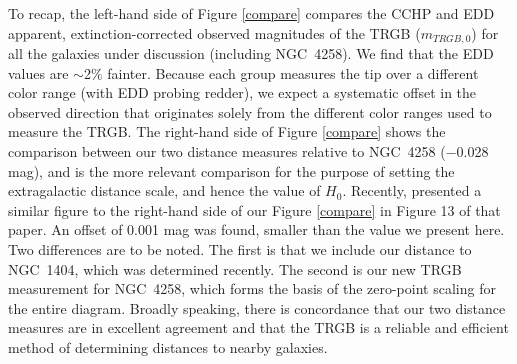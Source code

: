 \documentclass[twocolumn]{aastex62}
\begin{document}
To recap, the left-hand side of Figure \ref{compare} compares the CCHP and EDD apparent, extinction-corrected observed magnitudes of the TRGB ($m_{TRGB,0}$) for all the galaxies under discussion (including NGC~4258). We find that the EDD values are $\sim$2$\%$ fainter. Because each group measures the tip over a different color range (with EDD probing redder), we expect a systematic offset in the observed direction that originates solely from the different color ranges used to measure the TRGB. The right-hand side of Figure \ref{compare} shows the comparison between our two distance measures relative to NGC~4258 ($-$0.028 mag), and is the more relevant comparison for the purpose of setting the extragalactic distance scale, and hence the value of $H_{0}$. Recently, \cite{2021arXiv210613337H} presented a similar figure to the right-hand side of our Figure \ref{compare} in Figure 13 of that paper. An offset of 0.001 mag was found, smaller than the value we present here. Two differences are to be noted. The first is that we include our distance to NGC~1404, which was determined recently. The second is our new TRGB measurement for NGC~4258, which forms the basis of the zero-point scaling for the entire diagram. Broadly speaking, there is concordance that our two distance measures are in excellent agreement and that the TRGB is a reliable and efficient method of determining distances to nearby galaxies. 
\end{document}
